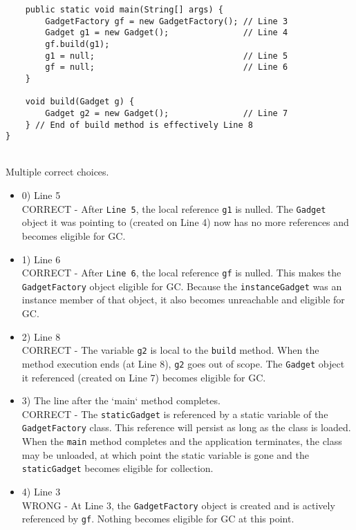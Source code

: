 \documentclass[12pt]{article}
\begin{document}
\begin{enumerate}[label=(\arabic*)]
\begin{verbatim}
    public static void main(String[] args) {
        GadgetFactory gf = new GadgetFactory(); // Line 3
        Gadget g1 = new Gadget();               // Line 4
        gf.build(g1);
        g1 = null;                              // Line 5
        gf = null;                              // Line 6
    }

    void build(Gadget g) {
        Gadget g2 = new Gadget();               // Line 7
    } // End of build method is effectively Line 8
}
\end{verbatim}
\\ \noindent Multiple correct choices. 
\begin{itemize}
\item 0) Line 5
 \\ 
CORRECT - After \verb|Line 5|, the local reference \verb|g1| is nulled. The \verb|Gadget| object it was pointing to (created on Line 4) now has no more references and becomes eligible for GC.

\item 1) Line 6
 \\ 
CORRECT - After \verb|Line 6|, the local reference \verb|gf| is nulled. This makes the \verb|GadgetFactory| object eligible for GC. Because the \verb|instanceGadget| was an instance member of that object, it also becomes unreachable and eligible for GC.

\item 2) Line 8
 \\ 
CORRECT - The variable \verb|g2| is local to the \verb|build| method. When the method execution ends (at Line 8), \verb|g2| goes out of scope. The \verb|Gadget| object it referenced (created on Line 7) becomes eligible for GC.

\item 3) The line after the `main` method completes.
 \\ 
CORRECT - The \verb|staticGadget| is referenced by a static variable of the \verb|GadgetFactory| class. This reference will persist as long as the class is loaded. When the \verb|main| method completes and the application terminates, the class may be unloaded, at which point the static variable is gone and the \verb|staticGadget| becomes eligible for collection.

\item 4) Line 3
 \\ 
WRONG - At Line 3, the \verb|GadgetFactory| object is created and is actively referenced by \verb|gf|. Nothing becomes eligible for GC at this point.


\end{itemize}
\end{enumerate}
\end{document}
